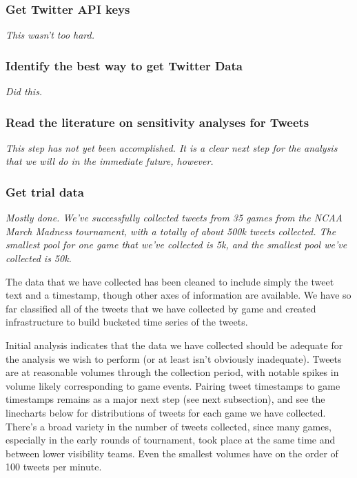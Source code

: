 \documentclass[12pt]{article}
\begin{document}
\subsubsection*{Get Twitter API keys}

\textit{This wasn't too hard.}

\subsubsection*{Identify the best way to get Twitter Data}

\textit{Did this.}

\subsubsection*{Read the literature on sensitivity analyses for Tweets}

\textit{This step has not yet been accomplished. It is a clear next step for the analysis that we will do in the immediate future, however.}

\subsubsection*{Get trial data}

\textit{Mostly done. We've successfully collected tweets
from 35 games from the NCAA March Madness
tournament, with a totally of about 500k tweets collected. The smallest pool for
one game that we've collected is 5k,
and the smallest pool we've collected
is 50k. }

The data that we have collected has been
cleaned to include simply the tweet text
and a timestamp, though other axes of
information are available. We have so
far classified all of the tweets that
we have collected by game and created
infrastructure to build bucketed
time series of the tweets.

Initial analysis indicates that the data
we have collected should be adequate 
for the analysis we wish to perform 
(or at least isn't obviously inadequate).
Tweets are at reasonable volumes
through the collection period, with
notable spikes in volume likely
corresponding to game events. 
Pairing tweet timestamps to game timestamps
remains as a major next step (see next subsection), and see the linecharts below
for distributions of tweets for each game
we have collected. There's a broad
variety in the number of tweets collected,
since many games, especially in the early
rounds of tournament, took place at
the same time and between lower
visibility teams. Even the smallest
volumes have on the order of 100 tweets per minute.
\end{document}
